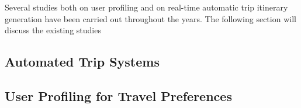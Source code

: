 Several studies both on user profiling and on real-time automatic trip
itinerary generation have been carried out throughout the years. The
following section will discuss the existing studies 

\subsection{Automated Trip Systems}

\subsection{User Profiling for Travel Preferences}
